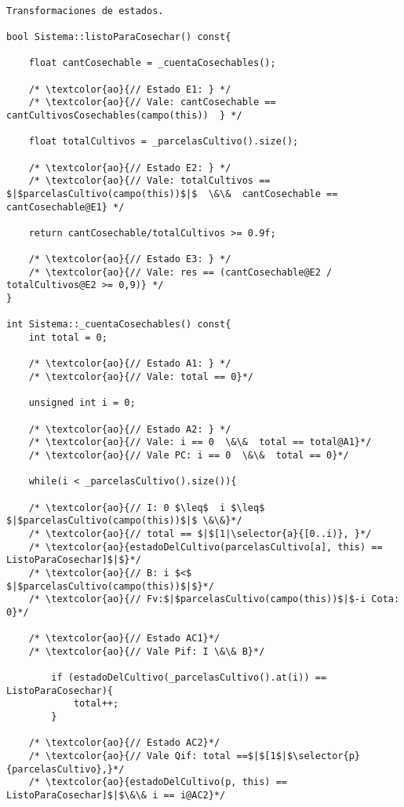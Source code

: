 \begin{lstlisting}

Transformaciones de estados.

bool Sistema::listoParaCosechar() const{
     
    float cantCosechable = _cuentaCosechables();

    /* \textcolor{ao}{// Estado E1: } */
    /* \textcolor{ao}{// Vale: cantCosechable == cantCultivosCosechables(campo(this))  } */

    float totalCultivos = _parcelasCultivo().size();
    
    /* \textcolor{ao}{// Estado E2: } */
    /* \textcolor{ao}{// Vale: totalCultivos == $|$parcelasCultivo(campo(this))$|$  \&\&  cantCosechable == cantCosechable@E1} */
    
    return cantCosechable/totalCultivos >= 0.9f;
    
    /* \textcolor{ao}{// Estado E3: } */
    /* \textcolor{ao}{// Vale: res == (cantCosechable@E2 / totalCultivos@E2 >= 0,9)} */
}

int Sistema::_cuentaCosechables() const{
    int total = 0;
	
    /* \textcolor{ao}{// Estado A1: } */
    /* \textcolor{ao}{// Vale: total == 0}*/
    
    unsigned int i = 0;

    /* \textcolor{ao}{// Estado A2: } */
    /* \textcolor{ao}{// Vale: i == 0  \&\&  total == total@A1}*/
    /* \textcolor{ao}{// Vale PC: i == 0  \&\&  total == 0}*/
    
    while(i < _parcelasCultivo().size()){

    /* \textcolor{ao}{// I: 0 $\leq$  i $\leq$ $|$parcelasCultivo(campo(this))$|$ \&\&}*/
    /* \textcolor{ao}{// total == $|$[1|\selector{a}{[0..i)}, }*/
	/* \textcolor{ao}{estadoDelCultivo(parcelasCultivo[a], this) == ListoParaCosechar]$|$}*/
    /* \textcolor{ao}{// B: i $<$ $|$parcelasCultivo(campo(this))$|$}*/
    /* \textcolor{ao}{// Fv:$|$parcelasCultivo(campo(this))$|$-i Cota: 0}*/    	
    	
    /* \textcolor{ao}{// Estado AC1}*/
    /* \textcolor{ao}{// Vale Pif: I \&\& B}*/
    		
        if (estadoDelCultivo(_parcelasCultivo().at(i)) == ListoParaCosechar){
            total++;
        }

    /* \textcolor{ao}{// Estado AC2}*/
    /* \textcolor{ao}{// Vale Qif: total ==$|$[1$|$\selector{p}{parcelasCultivo},}*/  
    /* \textcolor{ao}{estadoDelCultivo(p, this) == ListoParaCosechar]$|$\&\& i == i@AC2}*/


\end{lstlisting}
